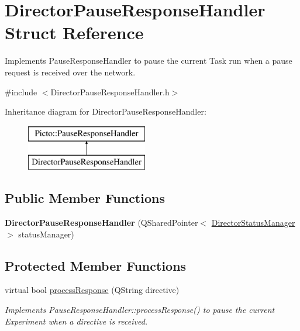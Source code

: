 \hypertarget{struct_director_pause_response_handler}{\section{Director\-Pause\-Response\-Handler Struct Reference}
\label{struct_director_pause_response_handler}
}


Implements Pause\-Response\-Handler to pause the current Task run when a pause request is received over the network.  




{\ttfamily \#include $<$Director\-Pause\-Response\-Handler.\-h$>$}

Inheritance diagram for Director\-Pause\-Response\-Handler\-:\begin{figure}[H]
\begin{center}
\leavevmode
\includegraphics[height=2.000000cm]{struct_director_pause_response_handler}
\end{center}
\end{figure}
\subsection*{Public Member Functions}
\begin{DoxyCompactItemize}
\item 
\hypertarget{struct_director_pause_response_handler_a812eeaf842a0ed0a1a00dbdb51939718}{{\bfseries Director\-Pause\-Response\-Handler} (Q\-Shared\-Pointer$<$ \hyperlink{class_director_status_manager}{Director\-Status\-Manager} $>$ status\-Manager)}\label{struct_director_pause_response_handler_a812eeaf842a0ed0a1a00dbdb51939718}

\end{DoxyCompactItemize}
\subsection*{Protected Member Functions}
\begin{DoxyCompactItemize}
\item 
\hypertarget{struct_director_pause_response_handler_a871e4e6e70d8bc39c81dd6ffae12b9a3}{virtual bool \hyperlink{struct_director_pause_response_handler_a871e4e6e70d8bc39c81dd6ffae12b9a3}{process\-Response} (Q\-String directive)}\label{struct_director_pause_response_handler_a871e4e6e70d8bc39c81dd6ffae12b9a3}

\begin{DoxyCompactList}\small\item\em Implements Pause\-Response\-Handler\-::process\-Response() to pause the current Experiment when a directive is received. \end{DoxyCompactList}\end{DoxyCompactItemize}


